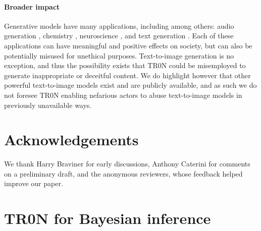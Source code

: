 \documentclass[nohyperref]{article}
\theoremstyle{plain}
\theoremstyle{definition}
\theoremstyle{remark}
\begin{document}
\paragraph{Broader impact} Generative models have many applications, including among others: 
audio generation \citep{oord2016wavenet, engel2017neural}, chemistry \citep{gomez2018automatic}, neuroscience \citep{sussillo2016lfads, gao2016linear, loaiza2019deep}, and text generation \citep{bowman2016generating, devlin2019bert, brown2020language}. Each of these applications can have meaningful and positive effects on society, but can also be potentially misused for unethical purposes. Text-to-image generation is no exception, and thus the possibility exists that TR0N could be misemployed to generate inappropriate or deceitful content. We do highlight however that other powerful text-to-image models exist and are publicly available, and as such we do not foresee TR0N enabling nefarious actors to abuse text-to-image models in previously unavailable ways. 
\section*{Acknowledgements}
We thank Harry Braviner for early discussions, Anthony Caterini for comments on a preliminary draft, and the anonymous reviewers, whose feedback helped improve our paper.












\newpage
\appendix
\onecolumn
\section{TR0N for Bayesian inference}\label{app:bayes}
\end{document}
